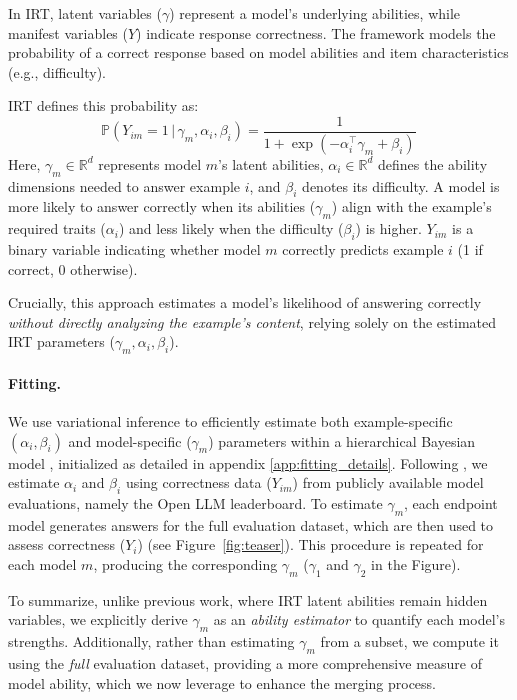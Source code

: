 In IRT, latent variables ($\gamma$) represent a model's underlying abilities, while manifest variables ($Y$) indicate response correctness. The framework models the probability of a correct response based on model abilities and item characteristics (e.g., difficulty).

IRT defines this probability as:
\begin{equation}
     \mathbb{P}(Y_{im} = 1 \, | \, \gamma_m, \alpha_i, \beta_i) = \frac{1}{1 + \exp(-\alpha_i^\top \gamma_m + \beta_i)} \,
    \label{eq:irt}
\end{equation}
%
Here, ${\gamma_m \in \mathbb{R}^d}$ represents model $m$'s latent abilities, $\alpha_i \in \mathbb{R}^d$ defines the ability dimensions needed to answer example $i$, and $\beta_i$ denotes its difficulty. 
%
A model is more likely to answer correctly when its abilities ($\gamma_m$) align with the example’s required traits ($\alpha_i$) and less likely when the difficulty ($\beta_i$) is higher.
%
$Y_{im}$ is a binary variable indicating whether model $m$ correctly predicts example $i$ (1 if correct, 0 otherwise).

Crucially, this approach estimates a model’s likelihood of answering correctly {\em without directly analyzing the example's content}, relying solely on the estimated IRT parameters ($\gamma_m, \alpha_i, \beta_i$).

\paragraph{Fitting.}\label{sec:fit_irt}
We use variational inference to efficiently estimate both example-specific $(\alpha_i, \beta_i)$ and model-specific ($\gamma_m$) parameters within a hierarchical Bayesian model \citep{lalor2023py}, initialized as detailed in appendix \ref{app:fitting_details}.
Following \citet{tinybenchmarks}, we estimate $\alpha_i$ and $\beta_i$ using correctness data ($Y_{im}$) from publicly available model evaluations, namely the Open LLM leaderboard. 
%
To estimate $\gamma_m$, each endpoint model generates answers for the full evaluation dataset, which are then used to assess correctness ($Y_i$) (see Figure~\ref{fig:teaser}). This procedure is repeated for each model $m$, producing the corresponding $\gamma_m$ ($\gamma_1$ and $\gamma_2$ in the Figure).

To summarize, unlike previous work, where IRT latent abilities remain hidden variables, we explicitly derive $\gamma_m$ as an {\em ability estimator} to quantify each model's strengths. Additionally, rather than estimating $\gamma_m$ from a subset, we compute it using the {\em full} evaluation dataset, providing a more comprehensive measure of model ability, which we now leverage to enhance the merging process.

